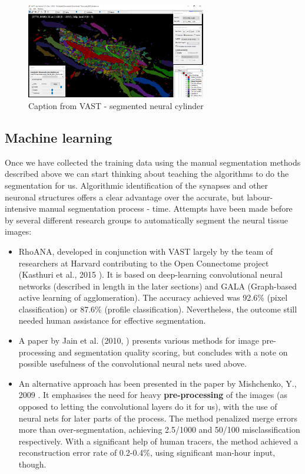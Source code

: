 \documentclass[a4paper, 11pt]{article}
\numberwithin{equation}{section}
\begin{document}
		\begin{figure}
			\centering
			\includegraphics[width=0.70\textwidth]{manual_segmentation.PNG}
			\caption{\label{fig:manual_segmentation}Caption from VAST - segmented neural cylinder}
		\end{figure}
		
		\subsection{Machine learning}
		\label{MachLearn}
		Once we have collected the training data using the manual segmentation methods described above we can start thinking about teaching the algorithms to do the segmentation for us. Algorithmic identification of the synapses and other neuronal structures offers a clear advantage over the accurate, but labour-intensive manual segmentation process - time. Attempts have been made before by several different research groups to automatically segment the neural tissue images:
		
		\begin{itemize}
			\item RhoANA, developed in conjunction with VAST largely by the team of researchers at Harvard contributing to the Open Connectome project (Kasthuri et al., 2015 \cite{kasthuri2015saturated}). It is based on deep-learning convolutional neural networks (described in length in the later sections) and GALA (Graph-based active learning of agglomeration). The accuracy achieved was 92.6\% (pixel classification) or 87.6\% (profile classification). Nevertheless, the outcome still needed human assistance for effective segmentation.
			
			\item A paper by Jain et al. (2010, \cite{jain2010machines}) presents various methods for image pre-processing and segmentation quality scoring, but concludes with a note on possible usefulness of the convolutional neural nets used above.
			
			\item An alternative approach has been presented in the paper by Mishchenko, Y., 2009 \cite{mishchenko2009automation}. It emphasises the need for heavy \textbf{pre-processing} of the images (as opposed to letting the convolutional layers do it for us), with the use of neural nets for later parts of the process. The method penalized merge errors more than over-segmentation, achieving 2.5/1000 and 50/100 misclassification respectively. With a significant help of human tracers, the method achieved a reconstruction error rate of 0.2-0.4\%, using significant man-hour input, though. 
		\end{itemize}
		
\end{document}
